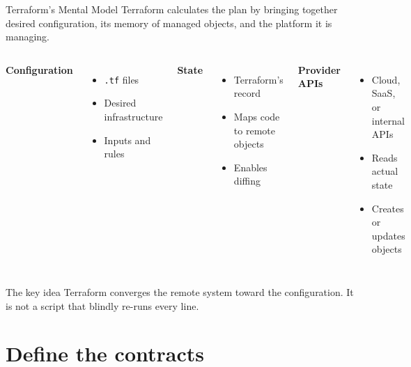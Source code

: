\documentclass[aspectratio=169, xcolor=table]{beamer}
\begin{document}
\begin{frame}{Terraform's Mental Model}
  Terraform calculates the plan by bringing together desired configuration, its memory of
  managed objects, and the platform it is managing.

  \vspace{0.7em}
  \begin{columns}[T]
    \textbf{Configuration}
    \begin{itemize}
      \item \texttt{.tf} files
      \item Desired infrastructure
      \item Inputs and rules
    \end{itemize}

    \textbf{State}
    \begin{itemize}
      \item Terraform's record
      \item Maps code to remote objects
      \item Enables diffing
    \end{itemize}

    \textbf{Provider APIs}
    \begin{itemize}
      \item Cloud, SaaS, or internal APIs
      \item Reads actual state
      \item Creates or updates objects
    \end{itemize}
  \end{columns}

  \vspace{0.8em}
  \begin{block}{The key idea}
    Terraform converges the remote system toward the configuration. It is not a script
    that blindly re-runs every line.
  \end{block}
\end{frame}

\section{Define the contracts}
\end{document}
